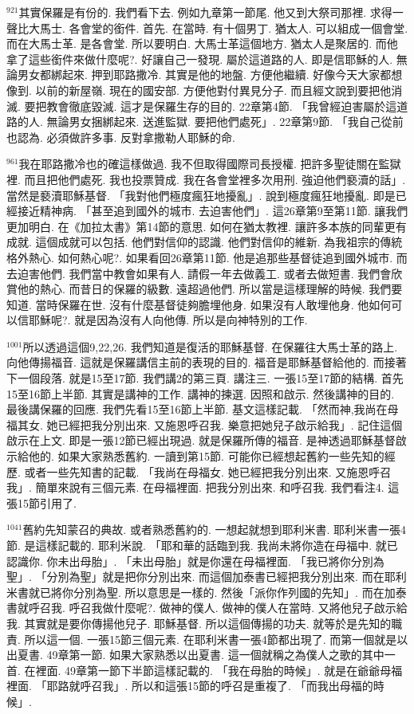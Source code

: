 \documentclass{book}
\begin{document}
$^{921}$其實保羅是有份的.
我們看下去.
例如九章第一節尾.
他又到大祭司那裡.
求得一聲比大馬士.
各會堂的銜件.
首先.
在當時.
有十個男丁.
猶太人.
可以組成一個會堂.
而在大馬士革.
是各會堂.
所以要明白.
大馬士革這個地方.
猶太人是聚居的.
而他拿了這些銜件來做什麼呢?.
好讓自己一發現.
屬於這道路的人.
即是信耶穌的人.
無論男女都綁起來.
押到耶路撒冷.
其實是他的地盤.
方便他繼續.
好像今天大家都想像到.
以前的新屋嶺.
現在的國安部.
方便他對付異見分子.
而且經文說到要把他消滅.
要把教會徹底毀滅.
這才是保羅生存的目的.
22章第4節.
「我曾經迫害屬於這道路的人.
無論男女捆綁起來.
送進監獄.
要把他們處死」.
22章第9節.
「我自己從前也認為.
必須做許多事.
反對拿撒勒人耶穌的命.

$^{961}$我在耶路撒冷也的確這樣做過.
我不但取得國際司長授權.
把許多聖徒關在監獄裡.
而且把他們處死.
我也投票贊成.
我在各會堂裡多次用刑.
強迫他們褻瀆的話」.
當然是褻瀆耶穌基督.
「我對他們極度瘋狂地擾亂」.
說到極度瘋狂地擾亂.
即是已經接近精神病.
「甚至追到國外的城市.
去迫害他們」.
這26章第9至第11節.
讓我們更加明白.
在《加拉太書》第14節的意思.
如何在猶太教裡.
讓許多本族的同輩更有成就.
這個成就可以包括.
他們對信仰的認識.
他們對信仰的維新.
為我祖宗的傳統格外熱心.
如何熱心呢?.
如果看回26章第11節.
他是追那些基督徒追到國外城市.
而去迫害他們.
我們當中教會如果有人.
請假一年去做義工.
或者去做短書.
我們會欣賞他的熱心.
而昔日的保羅的級數.
遠超過他們.
所以當是這樣理解的時候.
我們要知道.
當時保羅在世.
沒有什麼基督徒夠膽埋他身.
如果沒有人敢埋他身.
他如何可以信耶穌呢?.
就是因為沒有人向他傳.
所以是向神特別的工作.

$^{1001}$所以透過這個9,22,26.
我們知道是復活的耶穌基督.
在保羅往大馬士革的路上.
向他傳揚福音.
這就是保羅講信主前的表現的目的.
福音是耶穌基督給他的.
而接著下一個段落.
就是15至17節.
我們講2的第三頁.
講注三.
一張15至17節的結構.
首先15至16節上半節.
其實是講神的工作.
講神的揀選.
因照和啟示.
然後講神的目的.
最後講保羅的回應.
我們先看15至16節上半節.
基文這樣記載.
「然而神,我尚在母福其女.
她已經把我分別出來.
又施恩呼召我.
樂意把她兒子啟示給我」.
記住這個啟示在上文.
即是一張12節已經出現過.
就是保羅所傳的福音.
是神透過耶穌基督啟示給他的.
如果大家熟悉舊約.
一讀到第15節.
可能你已經想起舊約一些先知的經歷.
或者一些先知書的記載.
「我尚在母福女.
她已經把我分別出來.
又施恩呼召我」.
簡單來說有三個元素.
在母福裡面.
把我分別出來.
和呼召我.
我們看注4.
這張15節引用了.

$^{1041}$舊約先知蒙召的典故.
或者熟悉舊約的.
一想起就想到耶利米書.
耶利米書一張4節.
是這樣記載的.
耶利米說.
「耶和華的話臨到我.
我尚未將你造在母福中.
就已認識你.
你未出母胎」.
「未出母胎」就是你還在母福裡面.
「我已將你分別為聖」.
「分別為聖」就是把你分別出來.
而這個加泰書已經把我分別出來.
而在耶利米書就已將你分別為聖.
所以意思是一樣的.
然後「派你作列國的先知」.
而在加泰書就呼召我.
呼召我做什麼呢?.
做神的僕人.
做神的僕人在當時.
又將他兒子啟示給我.
其實就是要你傳揚他兒子.
耶穌基督.
所以這個傳揚的功夫.
就等於是先知的職責.
所以這一個.
一張15節三個元素.
在耶利米書一張4節都出現了.
而第一個就是以出夏書.
49章第一節.
如果大家熟悉以出夏書.
這一個就稱之為僕人之歌的其中一首.
在裡面.
49章第一節下半節這樣記載的.
「我在母胎的時候」.
就是在爺爺母福裡面.
「耶路就呼召我」.
所以和這張15節的呼召是重複了.
「而我出母福的時候」.
\end{document}
